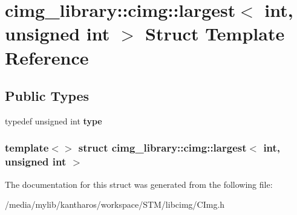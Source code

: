 \hypertarget{structcimg__library_1_1cimg_1_1largest_3_01int_00_01unsigned_01int_01_4}{
\section{cimg\_\-library::cimg::largest$<$ int, unsigned int $>$ Struct Template Reference}
\label{structcimg__library_1_1cimg_1_1largest_3_01int_00_01unsigned_01int_01_4}
}
\subsection*{Public Types}
\begin{DoxyCompactItemize}
\item 
\hypertarget{structcimg__library_1_1cimg_1_1largest_3_01int_00_01unsigned_01int_01_4_a1fc96f7f83787090832a6eedf8ec1fac}{
typedef unsigned int {\bfseries type}}
\label{structcimg__library_1_1cimg_1_1largest_3_01int_00_01unsigned_01int_01_4_a1fc96f7f83787090832a6eedf8ec1fac}

\end{DoxyCompactItemize}
\subsubsection*{template$<$$>$ struct cimg\_\-library::cimg::largest$<$ int, unsigned int $>$}



The documentation for this struct was generated from the following file:\begin{DoxyCompactItemize}
\item 
/media/mylib/kantharos/workspace/STM/libcimg/CImg.h\end{DoxyCompactItemize}
